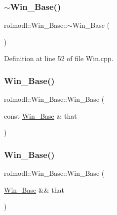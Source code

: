\subsubsection{\texorpdfstring{$\sim$Win\_Base()}{~Win\_Base()}}
{\footnotesize\ttfamily rolmodl\+::\+Win\+\_\+\+Base\+::$\sim$\+Win\+\_\+\+Base (\begin{DoxyParamCaption}{ }\end{DoxyParamCaption})\hspace{0.3cm}{\ttfamily [noexcept]}}



Definition at line 52 of file Win.\+cpp.

\mbox{\label{classrolmodl_1_1_win___base_afa33e371e1333e1fee8c2aac7fadf3d7}} 
\subsubsection{\texorpdfstring{Win\_Base()}{Win\_Base()}\hspace{0.1cm}{\footnotesize\ttfamily [5/6]}}
{\footnotesize\ttfamily rolmodl\+::\+Win\+\_\+\+Base\+::\+Win\+\_\+\+Base (\begin{DoxyParamCaption}\item[{const \mbox{\hyperlink{classrolmodl_1_1_win___base}{Win\+\_\+\+Base}} \&}]{that }\end{DoxyParamCaption})\hspace{0.3cm}{\ttfamily [delete]}}

\mbox{\label{classrolmodl_1_1_win___base_a87cda590b1948eaf6d1638fe044cdd63}} 
\subsubsection{\texorpdfstring{Win\_Base()}{Win\_Base()}\hspace{0.1cm}{\footnotesize\ttfamily [6/6]}}
{\footnotesize\ttfamily rolmodl\+::\+Win\+\_\+\+Base\+::\+Win\+\_\+\+Base (\begin{DoxyParamCaption}\item[{\mbox{\hyperlink{classrolmodl_1_1_win___base}{Win\+\_\+\+Base}} \&\&}]{that }\end{DoxyParamCaption})\hspace{0.3cm}{\ttfamily [noexcept]}}



